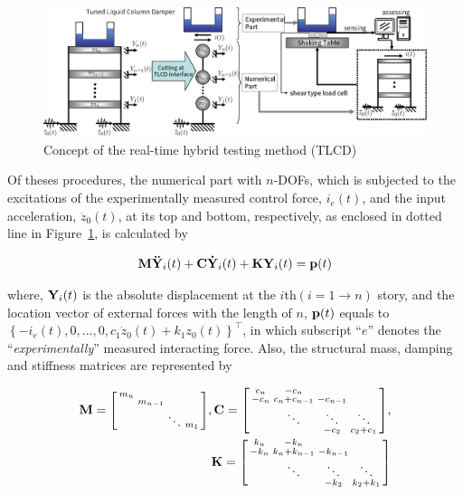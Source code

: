 \begin{figure}[ht]
\centering
\includegraphics[width=1\textwidth] {figure/4-1.eps}
\caption{Concept of the real-time hybrid testing method (TLCD)}
\label{fig:4-1}
\end{figure}

Of theses procedures, the numerical part with $n$-DOFs, which is subjected to the excitations of the experimentally measured control force, $i_{e}(t)$, and the input acceleration, $\ddot{z}_{0}(t)$, at its top and bottom, respectively, as enclosed in dotted line in Figure~\ref{fig:4-1}, is calculated by

\begin{equation}\label{eq:4-1}
\mathbf{M}\mathbf{\ddot{Y}}_{i}(t)+\mathbf{C}\mathbf{\dot{Y}}_{i}(t)+\mathbf{K}\mathbf{Y}_{i}(t)=\mathbf{p}(t)
\end{equation}

where, $\mathbf{Y}_{i}(t)$ is the absolute displacement at the $i$th$\left(i=1\rightarrow n\right)$ story, and the location vector of external forces with the length of $n$, $\mathbf{p}(t)$  equals to $\left\{ -i_{e}(t),0,...,0,c_{1}\dot{z}_{0}(t)+k_{1}z_{0}(t)\right\}^{\top}$, in which subscript ``$e$'' denotes the ``\textit{experimentally}'' measured interacting force. Also, the structural mass, damping and stiffness matrices are represented by

\begin{equation}\label{eq:4-2}
\begin{aligned}
\mathbf{M}=\begin{bsmallmatrix}m_{n}&&&\\&m_{n-1}&&\\&&\ddots&m_{1}\end{bsmallmatrix},
\mathbf{C}=\begin{bsmallmatrix}c_{n}&-c_{n}&&\\-c_{n}&c_{n}+c_{n-1}&-c_{n-1}&\\ &\ddots&\ddots&\ddots\\&&-c_{2}&c_{2}+c_{1}\end{bsmallmatrix},\\
\mathbf{K}=\begin{bsmallmatrix}k_{n}&-k_{n}&&\\-k_{n}&k_{n}+k_{n-1}&-k_{n-1}&\\ &\ddots&\ddots&\ddots\\&&-k_{2}&k_{2}+k_{1}\end{bsmallmatrix}
\end{aligned}
\end{equation}


